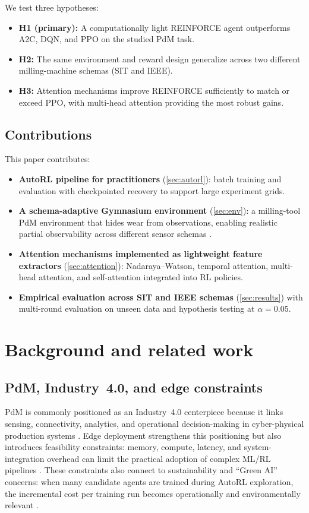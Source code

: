 \documentclass[11pt]{article}
\begin{document}
We test three hypotheses:
\begin{itemize}
	\item \textbf{H1 (primary):} A computationally light REINFORCE agent outperforms A2C, DQN, and PPO on the studied PdM task.
	\item \textbf{H2:} The same environment and reward design generalize across two different milling-machine schemas (SIT and IEEE).
	\item \textbf{H3:} Attention mechanisms improve REINFORCE sufficiently to match or exceed PPO, with multi-head attention providing the most robust gains.
\end{itemize}

\subsection{Contributions}
\label{sec:contrib}
This paper contributes:
\begin{itemize}
	\item \textbf{AutoRL pipeline for practitioners} (\cref{sec:autorl}): batch training and evaluation with checkpointed recovery to support large experiment grids.
	\item \textbf{A schema-adaptive Gymnasium environment} (\cref{sec:env}): a milling-tool PdM environment that hides wear from observations, enabling realistic partial observability across different sensor schemas \parencite{Gymnasium2023}.
	\item \textbf{Attention mechanisms implemented as lightweight feature extractors} (\cref{sec:attention}): Nadaraya--Watson, temporal attention, multi-head attention, and self-attention integrated into RL policies.
	\item \textbf{Empirical evaluation across SIT and IEEE schemas} (\cref{sec:results}) with multi-round evaluation on unseen data and hypothesis testing at $\alpha=0.05$.
\end{itemize}

\section{Background and related work}
\label{sec:background}
\subsection{PdM, Industry~4.0, and edge constraints}
PdM is commonly positioned as an Industry~4.0 centerpiece because it links sensing, connectivity, analytics, and operational decision-making in cyber-physical production systems \parencite{Compare2020IoT, Zonta2020PdM}. Edge deployment strengthens this positioning but also introduces feasibility constraints: memory, compute, latency, and system-integration overhead can limit the practical adoption of complex ML/RL pipelines \parencite{Njor2024TinyML, Pandey2023EdgeDNN}. These constraints also connect to sustainability and ``Green AI'' concerns: when many candidate agents are trained during AutoRL exploration, the incremental cost per training run becomes operationally and environmentally relevant \parencite{Schwartz2020GreenAI, Strubell2019Energy}.
\end{document}
